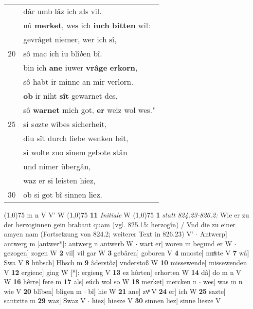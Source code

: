 \documentclass[8pt,a4paper,notitlepage]{article}
\begin{document}
\begin{table}[ht]
\begin{minipage}[t]{0.5\linewidth}
\begin{tabular}{rl}
 & dâr umb lâz ich als vil.\\ 
 & nû \textbf{merket}, wes ich \textbf{iuch} \textbf{bitten} wil:\\ 
 & gevrâget niemer, wer ich sî,\\ 
20 & sô mac ich iu blî\textit{b}en bî.\\ 
 & bin ich \textbf{ane} iuwer \textbf{vrâge} \textbf{erkorn},\\ 
 & sô habt ir minne an mir verlorn.\\ 
 & \textbf{ob} ir niht \textbf{sît} gewarnet des,\\ 
 & sô \textbf{warnet} mich got, \textbf{er} weiz wol wes."\\ 
25 & si s\textit{a}zte wîbes sicherheit,\\ 
 & diu sît durch liebe wenken leit,\\ 
 & si wolte zuo sînem gebote stân\\ 
 & und nimer übergân,\\ 
 & waz er si leisten hiez,\\ 
30 & ob si got bî sinnen liez.\\ 
\end{tabular}
\scriptsize
\line(1,0){75} \newline
m n V V' W \newline
\line(1,0){75} \newline
\textbf{11} \textit{Initiale} W  \newline
\line(1,0){75} \newline
\textbf{1} \textit{statt 824.23-826.2:} Wie er zu der herzoginnen gein brabant quam (vgl. 825.15: herzogîn) / Vnd die zu einer amyen nam (Fortsetzung von 824.2; weiterer Text in 826.23) V'   $\cdot$ Antwerp] antwerg m [antwer*]: antwerg n antwerb W  $\cdot$ wart er] woren m begund er W  $\cdot$ gezogen] zogen W \textbf{2} vil] vil gar W \textbf{3} gebâren] goboren V \textbf{4} muoste] muͤste V \textbf{7} wâ] Swa V \textbf{8} hübsch] Hbsch m \textbf{9} âderstôz] vnderstoß W \textbf{10} missewende] missewenden V \textbf{12} ergienc] ging W [*]: ergieng V \textbf{13} ez hôrten] erhorten W \textbf{14} dâ] do m n V W \textbf{16} hêrre] fere m \textbf{17} als] eúch wol so W \textbf{18} merket] mercken n  $\cdot$ wes] was m n wie V \textbf{20} blîben] bligen m  $\cdot$ bî] hie W \textbf{21} ane] zvͦ V \textbf{24} er] ich W \textbf{25} sazte] santztte m \textbf{29} waz] Swaz V  $\cdot$ hiez] hiesze V \textbf{30} sinnen liez] sinne liesze V \newline
\end{minipage}
\end{table}
\end{document}
